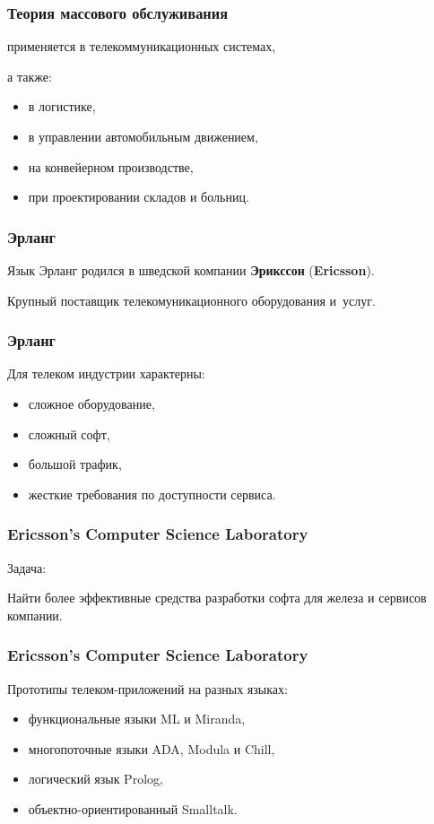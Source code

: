 \documentclass[10pt]{beamer}
\begin{document}
\begin{frame}
  \frametitle{Теория массового обслуживания}
  применяется в телекоммуникационных системах,
  \par \bigskip
  а также:
  \begin{itemize}
  \item в логистике,
  \item в управлении автомобильным движением,
  \item на конвейерном производстве,
  \item при проектировании складов и больниц.
  \end{itemize}
\end{frame}

\begin{frame}
  \frametitle{Эрланг}
  Язык Эрланг родился в шведской компании \textbf{Эрикссон} (\textbf{Ericsson}).
  \par \bigskip
  Крупный поставщик телекомуникационного оборудования и~услуг.
\end{frame}

\begin{frame}
  \frametitle{Эрланг}
  Для телеком индустрии характерны:
  \begin{itemize}
  \item сложное оборудование,
  \item сложный софт,
  \item большой трафик,
  \item жесткие требования по доступности сервиса.
  \end{itemize}
\end{frame}

\begin{frame}
  \frametitle{Ericsson’s Computer Science Laboratory}
  Задача:
  \par \bigskip
  Найти более эффективные средства разработки софта для железа и сервисов компании.
\end{frame}

\begin{frame}
  \frametitle{Ericsson’s Computer Science Laboratory}
  Прототипы телеком-приложений на разных языках:
  \begin{itemize}
  \item функциональные языки ML и Miranda,
  \item многопоточные языки ADA, Modula и Chill,
  \item логический язык Prolog,
  \item объектно-ориентированный Smalltalk.
  \end{itemize}
\end{frame}
\end{document}
